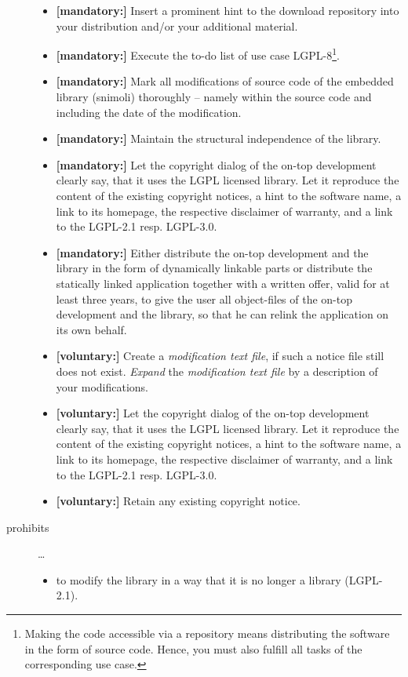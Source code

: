 \begin{description}
\begin{itemize}
  \item \textbf{[mandatory:]} Insert a prominent hint to the download repository
  into your distribution and/or your additional material.
    
  \item \textbf{[mandatory:]} Execute the to-do list of use case LGPL-8\footnote{
  Making the code accessible via a repository means distributing the software in
  the form of source code. Hence, you must also fulfill all tasks of the
  corresponding use case.}.

  \item \textbf{[mandatory:]} Mark all modifications of source code of the
  embedded library (snimoli) thoroughly -- namely within the source code and
  including the date of the modification.

  \item \textbf{[mandatory:]}  Maintain the structural independence of the
  library.
    
  \item \textbf{[mandatory:]} Let the copyright dialog of the on-top development
  clearly say, that it uses the LGPL licensed library. Let it reproduce the
  content of the existing copyright notices, a hint to the software name, a link
  to its homepage, the respective disclaimer of warranty, and a link to the
  LGPL-2.1 resp. LGPL-3.0.
  
  \item \textbf{[mandatory:]} Either distribute the on-top development and the
  library in the form of dynamically linkable parts or distribute the statically
  linked application together with a written offer, valid for at least three
  years, to give the user all object-files of the on-top development and the
  library, so that he can relink the application on its own behalf.
     
  \item \textbf{[voluntary:]} Create a \emph{modification text file}, if such a
  notice file still does not exist. \emph{Expand} the \emph{modification text
  file} by a description of your modifications.
    
  
  \item \textbf{[voluntary:]} Let the copyright dialog of the on-top development
  clearly say, that it uses the LGPL licensed library. Let it reproduce the
  content of the existing copyright notices, a hint to the software name, a link
  to its homepage, the respective disclaimer of warranty, and a link to the
  LGPL-2.1 resp. LGPL-3.0.    
  

  \item \textbf{[voluntary:]} Retain any existing copyright notice. 
  
\end{itemize}

\item[prohibits] \ldots
\begin{itemize}
  \item to modify the library in a way that it is no longer a library
  (LGPL-2.1).
\end{itemize}

\end{description}

